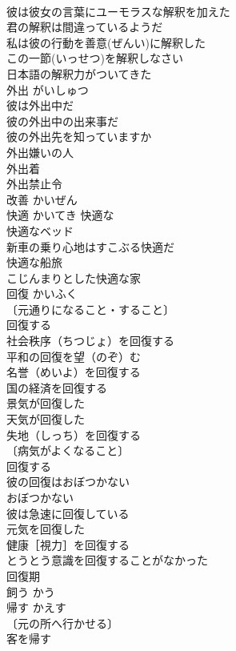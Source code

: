 \documentclass[8pt]{extreport}
\begin{document}
\begin{CJK}{UTF8}{min}
\\	彼は彼女の言葉にユーモラスな解釈を加えた 
\\	君の解釈は間違っているようだ 
\\	私は彼の行動を善意(ぜんい)に解釈した 
\\	この一節(いっせつ)を解釈しなさい 
\\	日本語の解釈力がついてきた 
\\	外出	がいしゅつ	
\\	彼は外出中だ 
\\	彼の外出中の出来事だ 
\\	彼の外出先を知っていますか 
\\	外出嫌いの人 
\\	外出着 
\\	外出禁止令 
\\	改善	かいぜん	
\\	快適	かいてき	快適な 
\\	快適なベッド 
\\	新車の乗り心地はすこぶる快適だ 
\\	快適な船旅 
\\	こじんまりとした快適な家 
\\	回復	かいふく	
\\	〔元通りになること・すること〕
\\	回復する 
\\	社会秩序（ちつじょ）を回復する 
\\	平和の回復を望（のぞ）む 
\\	名誉（めいよ）を回復する 
\\	国の経済を回復する 
\\	景気が回復した 
\\	天気が回復した 
\\	失地（しっち）を回復する 
\\	〔病気がよくなること〕
\\	回復する 
\\	彼の回復はおぼつかない 
\\	おぼつかない 
\\	彼は急速に回復している 
\\	元気を回復した 
\\	健康［視力］を回復する 
\\	とうとう意識を回復することがなかった 
\\	回復期 
\\	飼う	かう	
\\	帰す	かえす	
\\	〔元の所へ行かせる〕
\\	客を帰す 

\end{CJK}
\end{document}
